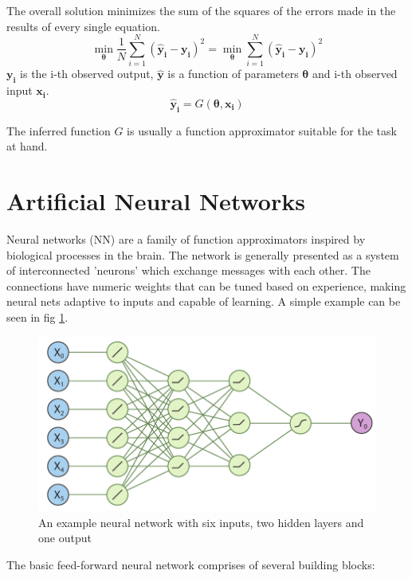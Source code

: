 The overall solution minimizes the sum of the squares of the errors made in the results of every single equation.
\begin{equation}
\label{eq:loss}
\min_{\mathbf{\theta}}\dfrac{1}{N} \sum_{i=1}^{N}\left(\mathbf{\hat{y}_i}-\mathbf{y_i}\right)^2
= \min_{\mathbf{\theta}} \sum_{i=1}^{N}\left(\mathbf{\hat{y}_i}-\mathbf{y_i}\right)^2
\end{equation}
$\mathbf{y_i}$ is the i-th observed output,  $\mathbf{\hat{y}}$ is a function of parameters $\mathbf{\theta}$ and i-th observed input $\mathbf{x_i}$.
\begin{equation}
\mathbf{\hat{y}_i}=G(\mathbf{\theta, x_i})
\end{equation}

The inferred function $G$ is usually a function approximator suitable for the task at hand. 

\section{Artificial Neural Networks}

Neural networks (NN) are a family of function approximators inspired by biological processes in the brain. The network is generally presented as a system of interconnected 'neurons' which exchange messages with each other. The connections have numeric weights that can be tuned based on experience, making neural nets adaptive to inputs and capable of learning. A simple example can be seen in fig \ref{fig:nn}.

\begin{figure}
\includegraphics[width=\textwidth]{images/supervised/nn.pdf}
\caption{An example neural network with six inputs, two hidden layers and one output}
\label{fig:nn}
\end{figure}


The basic feed-forward neural network comprises of several building blocks:

